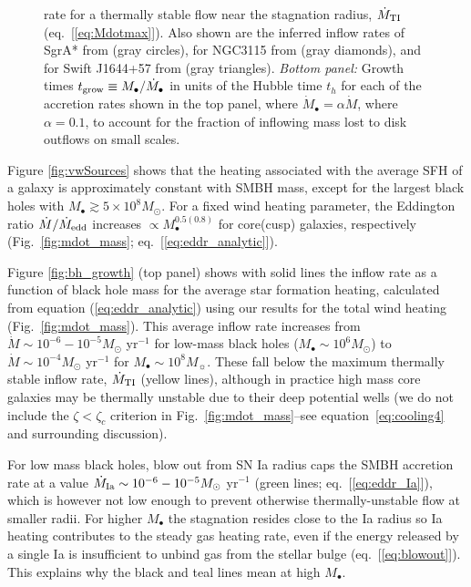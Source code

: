\documentclass[usenatbib,fleqn]{mn2e}
\newcommand{\Mbh}[1][]{M_{\bullet#1}}
\renewcommand{\th}{t_h}
\begin{document}
\begin{figure}
{  rate for a thermally stable flow near the stagnation radius,
  $\dot{M}_{\rm TI}$ (eq.~[\ref{eq:Mdotmax}]).  Also shown are the
  inferred inflow rates of SgrA* from \citet{Quataert:2004a} (gray
  circles), for NGC3115 from \citet{ShcherbakovWong+:2014a} (gray
  diamonds), and for Swift J1644+57 from \citet{BergerZauderer+:2012a}
  (gray triangles).  {\it Bottom panel:} Growth times $t_{\rm grow}
  \equiv \Mbh/\dot{M}_{\bullet}$ in units of the Hubble time $\th$ for
  each of the accretion rates shown in the top panel, where
  $\dot{M}_{\bullet} = \alpha\dot{M}$, where $\alpha = 0.1$, to
  account for the fraction of inflowing mass lost to disk outflows on
  small scales.}
\end{figure}

Figure \ref{fig:vwSources} shows that the heating associated with the
average SFH of a galaxy is approximately constant
with SMBH mass, except for the largest black holes with $M_{\bullet}
\gtrsim 5\times 10^{8}M_{\odot}$.  For a fixed wind heating parameter,
the Eddington ratio $\dot{M}/\dot{M}_{\rm edd}$ increases $\propto
M_{\bullet}^{0.5(0.8)}$ for core(cusp) galaxies, respectively
(Fig.~\ref{fig:mdot_mass}; eq.~[\ref{eq:eddr_analytic}]).

Figure \ref{fig:bh_growth} (top panel) shows with solid lines the
inflow rate as a function of black hole mass for the average star
formation heating, calculated from equation (\ref{eq:eddr_analytic})
using our results for the total wind heating
(Fig.~\ref{fig:mdot_mass}).  This average inflow rate increases
from $\dot{M} \sim 10^{-6}-10^{-5}M_{\odot}$ yr$^{-1}$ for low-mass
black holes ($M_{\bullet} \sim 10^{6}M_{\odot}$) to $\dot{M} \sim
10^{-4}M_{\odot}$ yr$^{-1}$ for $M_{\bullet} \sim 10^{8}M_{\sun}$.
These fall below the maximum thermally stable inflow rate,
$\dot{M}_{\rm TI}$ (yellow lines), although in practice high mass core
galaxies may be thermally unstable due to their deep potential wells
(we do not include the $\zeta<\zeta_c$ criterion in
Fig.~\ref{fig:mdot_mass}--see equation~\eqref{eq:cooling4} and
surrounding discussion).


For low mass black holes, blow out from SN Ia radius caps the SMBH
accretion rate at a value $\dot{M}_{\rm Ia} \sim
10^{-6}-10^{-5}M_{\odot}$ yr$^{-1}$ (green lines;
eq.~[\ref{eq:eddr_Ia}]), which is however not low enough to prevent
otherwise thermally-unstable flow at smaller radii.  For higher
$M_{\bullet}$ the stagnation resides close to the Ia radius so Ia
heating contributes to the steady gas heating rate, even if the energy
released by a single Ia is insufficient to unbind gas from the stellar
bulge (eq.~[\ref{eq:blowout}]).  This explains why the black and teal
lines mean at high $M_{\bullet}$.
\end{document}
